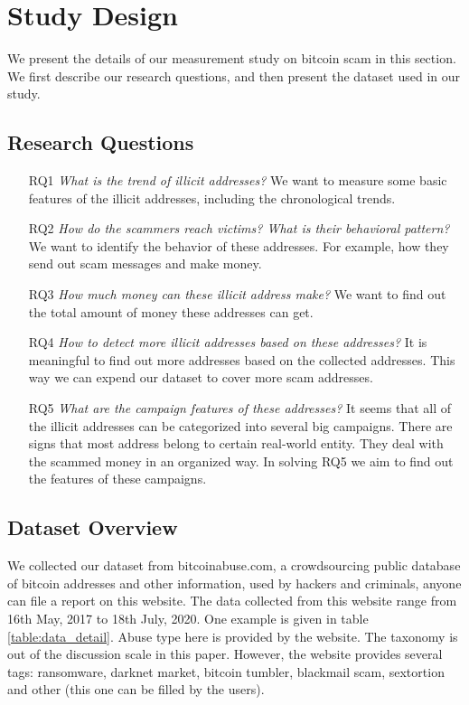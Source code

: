 \section{Study Design}
\label{sec:study-design}
We present the details of our measurement study on bitcoin scam in this section. We first describe our research questions, and then present the dataset used in our study.
\subsection{Research Questions}


\begin{itemize}
    \item[RQ1] \textit{What is the trend of illicit addresses?} We want to measure some basic features of the illicit addresses, including the chronological trends.
    \item[RQ2] \textit{How do the scammers reach victims? What is their behavioral pattern?} We want to identify the behavior of these addresses. For example, how they send out scam messages and make money.
    \item[RQ3] \textit{How much money can these illicit address make?} We want to find out the total amount of money these addresses can get.
    \item[RQ4] \textit{How to detect more illicit addresses based on these addresses?} It is meaningful to find out more addresses based on the collected addresses. This way we can expend our dataset to cover more scam addresses.
    \item[RQ5] \textit{What are the campaign features of these addresses?} It seems that all of the illicit addresses can be categorized into several big campaigns. There are signs that most address belong to certain real-world entity. They deal with the scammed money in an organized way. In solving RQ5 we aim to find out the features of these campaigns.
\end{itemize}

\subsection{Dataset Overview}


We collected our dataset from bitcoinabuse.com, a crowdsourcing public database of bitcoin addresses and other information, used by hackers and criminals\cite{bitcoinabuse}, anyone can file a report on this website. The data collected from this website range from 16th May, 2017 to 18th July, 2020. One example is given in table \ref{table:data_detail}. Abuse type here is provided by the website. The taxonomy is out of the discussion scale in this paper. However, the website provides several tags: ransomware, darknet market, bitcoin tumbler, blackmail scam, sextortion and other (this one can be filled by the users).


